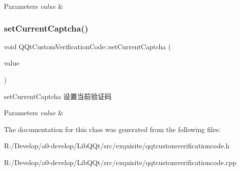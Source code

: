 \begin{DoxyParams}{Parameters}
{\em value} & \\
\hline
\end{DoxyParams}
\mbox{\label{class_q_qt_custom_verification_code_afd853478580805ed8a898475c56264cf}} 
\subsubsection{\texorpdfstring{set\+Current\+Captcha()}{setCurrentCaptcha()}}
{\footnotesize\ttfamily void Q\+Qt\+Custom\+Verification\+Code\+::set\+Current\+Captcha (\begin{DoxyParamCaption}\item[{const Q\+String \&}]{value }\end{DoxyParamCaption})}



set\+Current\+Captcha 设置当前验证码 


\begin{DoxyParams}{Parameters}
{\em value} & \\
\hline
\end{DoxyParams}


The documentation for this class was generated from the following files\+:\begin{DoxyCompactItemize}
\item 
R\+:/\+Develop/a0-\/develop/\+Lib\+Q\+Qt/src/exquisite/qqtcustomverificationcode.\+h\item 
R\+:/\+Develop/a0-\/develop/\+Lib\+Q\+Qt/src/exquisite/qqtcustomverificationcode.\+cpp\end{DoxyCompactItemize}
